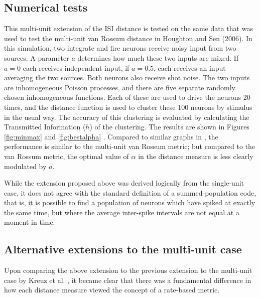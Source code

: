 \subsection{Numerical tests}
This multi-unit extension of the ISI distance is tested on the same data that was used to test the multi-unit van Rossum distance in Houghton and Sen (2006).   In this simulation, two integrate and fire neurons receive noisy input from two sources.  A parameter $a$ determines how much these two inputs are mixed.  If $a=0$ each receives independent input, if $a=0.5$, each receives an input averaging the two sources.  Both neurons also receive shot noise.  The two inputs are inhomogeneous Poisson processes, and there are five separate randomly chosen inhomogeneous functions. Each of these are used to drive the neurons 20 times, and the distance function is used to cluster these 100 neurons by stimulus in the usual way.  The accuracy of this clustering is evaluated by calculating the Transmitted Information ($h$) of the clustering.  The results are shown in Figures \ref{fig:minmax} and \ref{fig:bestalpha} . Compared to similar graphs in \cite{HoughtonSen2008}, the performance is similar to the multi-unit van Rossum metric; but compared to the van Rossum metric, the optimal value of $\alpha$ in the distance measure is less clearly modulated by $a$.  

%
%

While the extension proposed above was derived logically from the single-unit case, it does not agree with the standard definition of a summed-population code, that is, it is possible to find a population of neurons which have spiked at exactly the same time, but where the average inter-spike intervals are not equal at a moment in time.

\subsection{Alternative extensions to the multi-unit case}

Upon comparing the above extension to the previous extension to the multi-unit case by Kreuz et al. \cite{Kreuzetal2009}, it became clear that there was a fundamental difference in how each distance measure viewed the concept of a rate-based metric.


